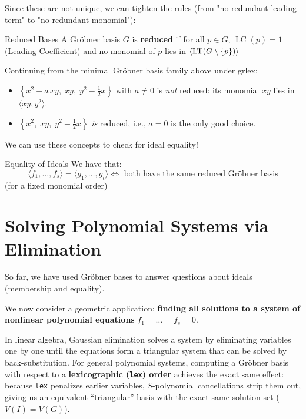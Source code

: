 \documentclass[a4paper, 11pt]{report}
\newcommand{\gen}[1]{\langle #1 \rangle}
\newcommand{\LT}{\operatorname{LT}}
\newcommand{\LC}{\operatorname{LC}}
\begin{document}
Since these are not unique, we can tighten the rules (from "no redundant leading term" to "no redundant monomial"):

\begin{defframe}{Reduced Bases}{}
    A Gr\"obner basis $G$ is \textbf{reduced} if for all $p \in G$, $\LC(p) =1$ (Leading Coefficient) and no monomial of $p$ lies in $\gen{\LT(G \setminus \set{p})}$
\end{defframe}

Continuing from the minimal Gröbner basis family above under grlex:
\begin{itemize}
    \item $\left\{x^2 + a\,xy,\; xy,\; y^2 - \tfrac{1}{2}x\right\}$ with $a \neq 0$ is \textit{not} reduced: its monomial $xy$ lies in $\langle xy, y^2 \rangle$.
    \item $\left\{x^2,\; xy,\; y^2 - \tfrac{1}{2}x\right\}$ \textit{is} reduced, i.e., $a = 0$ is the only good choice.
\end{itemize}

We can use these concepts to check for ideal equality!

\begin{thmframe}{Equality of Ideals}{}
    We have that:
    $$ \gen{f_1, \dots, f_{s}} = \gen{g_1, \dots , g_{t}} \iff \text{ both have the same reduced Gr\"obner basis} $$
    (for a fixed monomial order)
\end{thmframe}

\section{Solving Polynomial Systems via Elimination}
So far, we have used Gröbner bases to answer questions about ideals (membership and equality).

We now consider a geometric application: \textbf{finding all solutions to a system of nonlinear polynomial equations} $f_1 = \dots = f_s = 0$.

In linear algebra, Gaussian elimination solves a system by eliminating variables one by one until the equations form a triangular system that can be solved by back-substitution. For general polynomial systems, computing a Gröbner basis with respect to a \textbf{lexicographic (\texttt{lex}) order} achieves the exact same effect: because \texttt{lex} penalizes earlier variables, $S$-polynomial cancellations strip them out, giving us an equivalent ``triangular'' basis with the exact same solution set ($V(I) = V(G)$).
\end{document}
